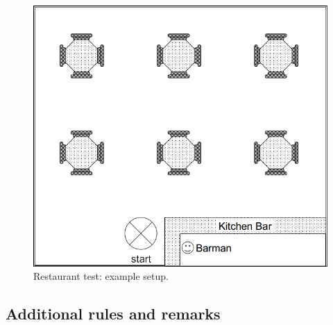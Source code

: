 \begin{figure}[tbp]
	\centering
	\includegraphics[width=0.5\columnwidth]{images/restaurant.png}
	\caption{Restaurant test: example setup.}
	\label{fig:restaurant}
\end{figure}

\subsection{Additional rules and remarks}

